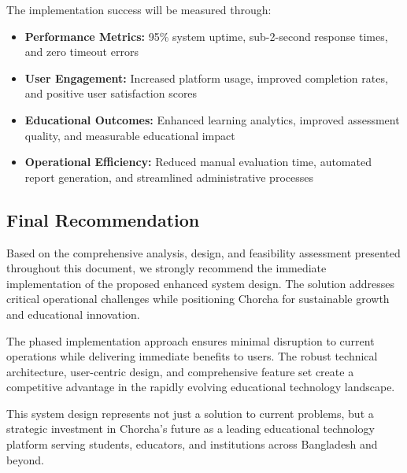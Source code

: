 \documentclass[12pt,a4paper,oneside]{book}
\begin{document}
The implementation success will be measured through:

\begin{itemize}
    \item \textbf{Performance Metrics:} 95\% system uptime, sub-2-second response times, and zero timeout errors
    \item \textbf{User Engagement:} Increased platform usage, improved completion rates, and positive user satisfaction scores
    \item \textbf{Educational Outcomes:} Enhanced learning analytics, improved assessment quality, and measurable educational impact
    \item \textbf{Operational Efficiency:} Reduced manual evaluation time, automated report generation, and streamlined administrative processes
\end{itemize}

\subsection{Final Recommendation}

Based on the comprehensive analysis, design, and feasibility assessment presented throughout this document, we strongly recommend the immediate implementation of the proposed enhanced system design. The solution addresses critical operational challenges while positioning Chorcha for sustainable growth and educational innovation.

The phased implementation approach ensures minimal disruption to current operations while delivering immediate benefits to users. The robust technical architecture, user-centric design, and comprehensive feature set create a competitive advantage in the rapidly evolving educational technology landscape.

This system design represents not just a solution to current problems, but a strategic investment in Chorcha's future as a leading educational technology platform serving students, educators, and institutions across Bangladesh and beyond.
\end{document}
